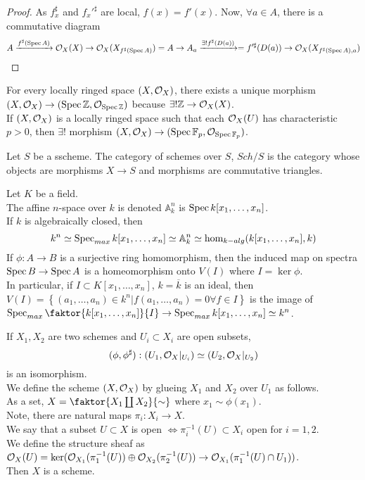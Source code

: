\documentclass[../main.tex]{subfiles}
\begin{document}
\begin{proof}
As $f_x^{\sharp}$ and $f_x'^{\sharp}$ are local, $f( x) = f'( x) $.
Now, $\forall a \in A$, there is a commutative diagram
\[ 
	A\xrightarrow{ f^{\sharp}( \operatorname{Spec} A) } \mathcal{O}_X( X) \to \mathcal{O}_X( X_{f^{\sharp}( \operatorname{Spec} A) }) = A \to A_a \xrightarrow{\exists! f^{\sharp}( D( a) )} = f'^{\sharp}( D( a) ) \to \mathcal{O}_X( X_{f^{\sharp}( \operatorname{Spec} A),a} ) 
\]

\end{proof}
\begin{exemple}
For every locally ringed space $( X,\mathcal{O}_X) $, there exists a unique morphism $ ( X,\mathcal{O}_X) \to ( \operatorname{Spec} \mathbb{Z}, \mathcal{O}_{ \operatorname{Spec} \mathbb{Z}} )  $ because $ \exists ! \mathbb{Z}\to \mathcal{O}_X( X) $.\\
If $( X,\mathcal{O}_X) $ is a locally ringed space such that each $\mathcal{O}_X( U) $ has characteristic $p >0$, then $\exists ! $ morphism $( X,\mathcal{O}_X) \to ( \operatorname{Spec} \mathbb{F}_p, \mathcal{O}_{\operatorname{Spec} \mathbb{F}_p} ) $.\\
\end{exemple}
\begin{defn}
	Let $S$  be a sscheme. The category of schemes over $S$, $Sch/S$ is the category whose objects are morphisms $X\to S$ and morphisms are commutative triangles.
\end{defn}
\begin{exemple}
Let $K$ be a field.\\
The affine $n$-space over $k$ is denoted $ \mathbb{A}^{n}_k$ is $\operatorname{Spec} k[x_1,\ldots, x_n]$.\\
If $k$ is algebraically closed, then 
\[ 
	k^{n}\simeq \operatorname{Spec}_{max}  k[x_1,\ldots,x_n]\simeq \mathbb{A}^{n}_k \simeq \hom_{k-alg} ( k[x_1,\ldots,x_n],k) 
\]
If $\phi:A\to B$ is a surjective ring homomorphism, then the induced map on spectra $\operatorname{Spec} B\to \operatorname{Spec} A$ is a homeomorphism onto $V( I) $ where $I = \ker\phi$.\\
In particular, if $I \subset K[x_1,\ldots,x_n]$, $k= \overline{k}$ is an ideal, then $V( I) = \left\{ ( a_1,\ldots,a_n) \in k^{n}| f( a_1,\ldots,a_n) =0 \forall f \in I \right\} $ is the image of $\spec_{max} \faktor{k[x_1,\ldots,x_n]}{I}\to \spec_{max}  k[x_1,\ldots,x_n] \simeq k^{n}$. \\
\end{exemple}
\begin{exemple}
	If $X_1,X_2$ are two schemes and $U_i \subset X_i$ are open subsets,
	\[ 
		( \phi,\phi^{\sharp}) : ( U_1,\mathcal{O}_X|_{U_i} ) \simeq ( U_2,\mathcal{O}_X|_{U_2} ) 
	\]
	is an isomorphism.\\
	We define the scheme $( X,\mathcal{O}_X) $ by glueing $X_1$ and $X_2$ over $U_1$  as follows.\\
	As a set, $X= \faktor{X_1\coprod X_2}{\sim}$ where $x_1\sim \phi( x_1) $.\\
	Note, there are natural maps $\pi_i: X_i\to X$.\\
	We say that a subset $U \subset X$ is open $\iff \pi_i^{-1}( U) \subset X_i$ open for $i=1,2$.\\
	We define the structure sheaf as $\mathcal{O}_X( U) = \ker ( \mathcal{O}_{X_1}(\pi_1^{-1}( U)) \oplus \mathcal{O}_{X_2}( \pi_2^{-1}( U) ) \to \mathcal{O}_{X_1} ( \pi_1^{-1}( U) \cap U_1)  ) $.\\
	Then $X$ is a scheme.
\end{exemple}
\end{document}
